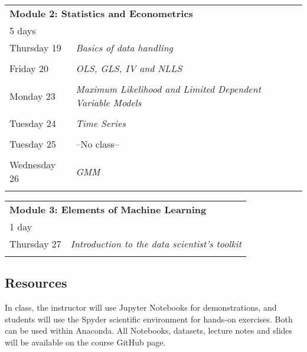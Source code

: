 \documentclass{article}
\numberwithin{equation}{section}
\begin{document}
\begin{center}
        \begin{tabular}{| p{2.5cm} | p{12.5cm} |}
    \hline
    \multicolumn{2}{|l|}{\textbf{Module 2: Statistics and Econometrics}} \\
    \multicolumn{2}{|l|}{5 days} \\
    \hline
    Thursday 19 & \textit{Basics of data handling} \\
        & \\
    Friday 20 & \textit{OLS, GLS, IV and NLLS}\\
        & \\
    Monday 23 & \textit{Maximum Likelihood and Limited Dependent Variable Models} \\
        & \\
    Tuesday 24 & \textit{Time Series}\\
        & \\
    Tuesday 25 & --No class--\\
        & \\
    Wednesday 26 & \textit{GMM} \\
        & \\
\hline
    \end{tabular}
\end{center}

\begin{center}
    \begin{tabular}{| p{2.5cm} | p{12.5cm} |}
    \hline
    \multicolumn{2}{|l|}{\textbf{Module 3: Elements of Machine Learning}} \\
    \multicolumn{2}{|l|}{1 day} \\
    \hline
    Thursday 27 & \textit{Introduction to the data scientist's toolkit} \\
        & \\
    \hline
    \end{tabular}

\end{center}

\begin{center}
    
\end{center}

\subsection*{Resources}

In class, the instructor will use Jupyter Notebooks for demonstrations, and students will use the Spyder scientific environment for hands-on exercises. Both can be used within Anaconda. All Notebooks, datasets, lecture notes and slides will be available on the course GitHub page.

\newpage 



\end{document}

